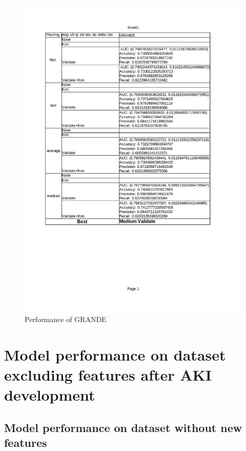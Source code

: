 \documentclass[../main.tex]{subfiles}
\begin{document}
 \begin{figure}[H]
    \centering
    \includegraphics[width=\textwidth]{Figure/KidneyResultNoLimit-new_GRANDE.png}
    \caption{Performance of GRANDE}
    \label{fig:KidneyResultNoLimit-new_GRANDE}
\end{figure}


\section{Model performance on dataset excluding features after AKI development}


\subsection{Model performance on dataset without new features}
\end{document}
